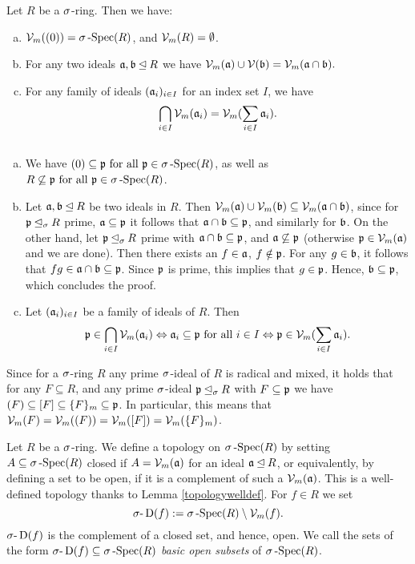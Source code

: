 \begin{lem}\label{topologywelldef}
Let $R$ be a $\sigma$-ring. Then we have:
\begin{enumerate}[(a)]
\item $\mathcal{V}_m((0)) = \sigma\operatorname{-Spec}(R)$, and $\mathcal{V}_m(R) = \emptyset$.
\item For any two ideals $\mathfrak{a},\mathfrak{b} \unlhd R$ we have $\mathcal{V}_m(\mathfrak{a}) \cup \mathcal{V}(\mathfrak{b}) = \mathcal{V}_m(\mathfrak{a} \cap \mathfrak{b}).$
\item For any family of ideals $(\mathfrak{a}_i)_{i \in I}$ for an index set $I$, we have $$\bigcap_{i \in I} \mathcal{V}_m(\mathfrak{a}_i) = \mathcal{V}_m(\sum_{i \in I} \mathfrak{a}_i).$$ \label{vmintersectionideals}
\end{enumerate}
\begin{bew} $~$
\begin{enumerate}[(a)]
\item We have $(0) \subseteq \mathfrak{p} \text{ for all } \mathfrak{p} \in \sigma\operatorname{-Spec}(R)$, as well as $R \not\subseteq \mathfrak{p} \text{ for all } \mathfrak{p} \in \sigma\operatorname{-Spec}(R)$.
\item Let $\mathfrak{a}, \mathfrak{b} \unlhd R$ be two ideals in $R$. Then $\mathcal{V}_m(\mathfrak{a}) \cup \mathcal{V}_m(\mathfrak{b}) \subseteq \mathcal{V}_m(\mathfrak{a} \cap \mathfrak{b})$, since for $\mathfrak{p} \unlhd_{\sigma} R$ prime, $\mathfrak{a} \subseteq \mathfrak{p}$ it follows that $\mathfrak{a} \cap \mathfrak{b} \subseteq \mathfrak{p}$, and similarly for $\mathfrak{b}$.
On the other hand, let $\mathfrak{p} \unlhd_{\sigma} R$ prime with $\mathfrak{a} \cap \mathfrak{b} \subseteq \mathfrak{p}$, and $\mathfrak{a} \not\subseteq \mathfrak{p}$ (otherwise $\mathfrak{p} \in \mathcal{V}_m(\mathfrak{a})$ and we are done). Then there exists an $f \in \mathfrak{a}$, $f \notin \mathfrak{p}$. 
For any $g \in \mathfrak{b}$, it follows that $fg \in \mathfrak{a} \cap \mathfrak{b} \subseteq \mathfrak{p}$. Since $\mathfrak{p}$ is prime, this implies that $g \in \mathfrak{p}$. Hence, $\mathfrak{b} \subseteq \mathfrak{p}$, which concludes the proof.
\item Let $(\mathfrak{a}_i)_{i \in I}$ be a family  of ideals of $R$. Then $$\mathfrak{p} \in \bigcap_{i \in I} \mathcal{V}_m(\mathfrak{a}_i) \Leftrightarrow \mathfrak{a}_i \subseteq \mathfrak{p} \text{ for all } i \in I \Leftrightarrow \mathfrak{p} \in \mathcal{V}_m(\sum_{i \in I} \mathfrak{a}_i).$$
\end{enumerate}
\end{bew}
\end{lem}


\begin{rem}\label{vmsequal}
Since for a $\sigma$-ring $R$ any prime $\sigma$-ideal of $R$ is radical and mixed, it holds that for any $F \subseteq R$, and any prime $\sigma$-ideal $\mathfrak{p} \unlhd_{\sigma} R$ with $F \subseteq \mathfrak{p}$ we have
$(F) \subseteq [F] \subseteq \{ F \}_m \subseteq \mathfrak{p}$. In particular, this means that $\mathcal{V}_m(F) = \mathcal{V}_m((F)) = \mathcal{V}_m([F]) = \mathcal{V}_m(\{F\}_m)$. 
\end{rem}

\begin{defn}\label{deftop}
Let $R$ be a $\sigma$-ring. We define a topology on $\sigma\operatorname{-Spec}(R)$ by setting $A \subseteq \sigma\operatorname{-Spec}(R)$ closed if $A = \mathcal{V}_m(\mathfrak{a})$ for an ideal $\mathfrak{a} \unlhd R$, or equivalently,
 by defining a set to be open, if it is a complement of such a $\mathcal{V}_m(\mathfrak{a})$. This is a well-defined topology thanks to Lemma \ref{topologywelldef}.
For $f \in R$ we set $$\sigma\text{-}\operatorname{D}(f):= \sigma\operatorname{-Spec}(R) \setminus \mathcal{V}_m(f).$$ $\sigma\text{-}\operatorname{D}(f)$ is the complement of a closed set, and hence, open. 
We call the sets of the form $\sigma\text{-}\operatorname{D}(f) \subseteq \sigma\operatorname{-Spec}(R)$ \emph{basic open subsets} of $\sigma\operatorname{-Spec}(R)$. 
\end{defn}

